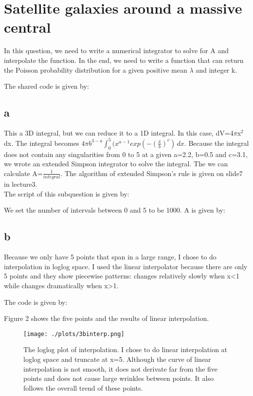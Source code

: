 \section{Satellite galaxies around a massive central}
In this question, we need to write a numerical integrator to solve for A and interpolate the function. In the end, we need to write a function that can return the Poisson probability distribution for a given positive mean $\lambda$ and integer k.

The shared code is given by:


\subsection{a}
This a 3D integral, but we can reduce it to a 1D integral. In this case, dV=4$\pi$x$^2$dx. The integral becomes $4\pi b^{3-a}\int_{0}^{5} (x^{a-1}exp(-(\frac{x}{b})^c) \,dx $. Because the integral does not contain any singularities from 0 to 5 at a given a=2.2, b=0.5 and c=3.1, we wrote an extended Simpson integrator to solve the integral. The we can calculate A=$\frac{1}{integral}$. The algorithm of extended Simpson's rule is given on slide7 in lecture3.\\

The script of this subquestion is given by:


We set the number of intervals between 0 and 5 to be 1000. A is given by:


\subsection{b}
Because we only have 5 points that span in a large range, I chose to do interpolation in loglog space. I used the linear interpolator because there are only 5 points and they show piecewise patterns: changes relatively slowly when x\textless 1 while changes dramatically when x\textgreater 1.

The code is given by:


Figure 2 shows the five points and the results of linear interpolation.

\begin{figure}[h!]
  \centering
  \texttt{[image: ./plots/3binterp.png]}
  \caption{The loglog plot of interpolation. I chose to do linear interpolation at loglog space and truncate at x=5. Although the curve of linear interpolation is not smooth, it does not derivate far from the five points and does not cause large wrinkles between points. It also follows the overall trend of these points.}
  \label{fig2}
\end{figure}


